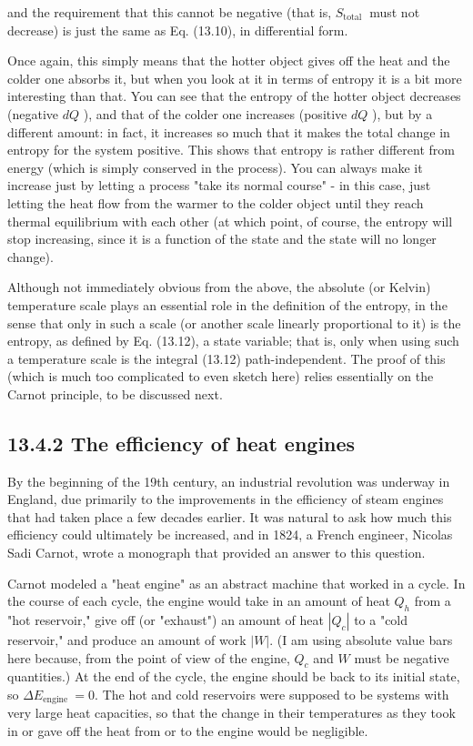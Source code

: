\documentclass[10pt]{article}
\begin{document}
and the requirement that this cannot be negative (that is, $S_{\text {total }}$ must not decrease) is just the same as Eq. (13.10), in differential form.

Once again, this simply means that the hotter object gives off the heat and the colder one absorbs it, but when you look at it in terms of entropy it is a bit more interesting than that. You can see that the entropy of the hotter object decreases (negative $d Q$ ), and that of the colder one increases (positive $d Q$ ), but by a different amount: in fact, it increases so much that it makes the total change in entropy for the system positive. This shows that entropy is rather different from energy (which is simply conserved in the process). You can always make it increase just by letting a process "take its normal course" - in this case, just letting the heat flow from the warmer to the colder object until they reach thermal equilibrium with each other (at which point, of course, the entropy will stop increasing, since it is a function of the state and the state will no longer change).

Although not immediately obvious from the above, the absolute (or Kelvin) temperature scale plays an essential role in the definition of the entropy, in the sense that only in such a scale (or another scale linearly proportional to it) is the entropy, as defined by Eq. (13.12), a state variable; that is, only when using such a temperature scale is the integral (13.12) path-independent. The proof of this (which is much too complicated to even sketch here) relies essentially on the Carnot principle, to be discussed next.

\subsection*{13.4.2 The efficiency of heat engines}
By the beginning of the 19th century, an industrial revolution was underway in England, due primarily to the improvements in the efficiency of steam engines that had taken place a few decades earlier. It was natural to ask how much this efficiency could ultimately be increased, and in 1824, a French engineer, Nicolas Sadi Carnot, wrote a monograph that provided an answer to this question.

Carnot modeled a "heat engine" as an abstract machine that worked in a cycle. In the course of each cycle, the engine would take in an amount of heat $Q_{h}$ from a "hot reservoir," give off (or "exhaust") an amount of heat $\left|Q_{c}\right|$ to a "cold reservoir," and produce an amount of work $|W|$. (I am using absolute value bars here because, from the point of view of the engine, $Q_{c}$ and $W$ must be negative quantities.) At the end of the cycle, the engine should be back to its initial state, so $\Delta E_{\text {engine }}=0$. The hot and cold reservoirs were supposed to be systems with very large heat capacities, so that the change in their temperatures as they took in or gave off the heat from or to the engine would be negligible.
\end{document}

